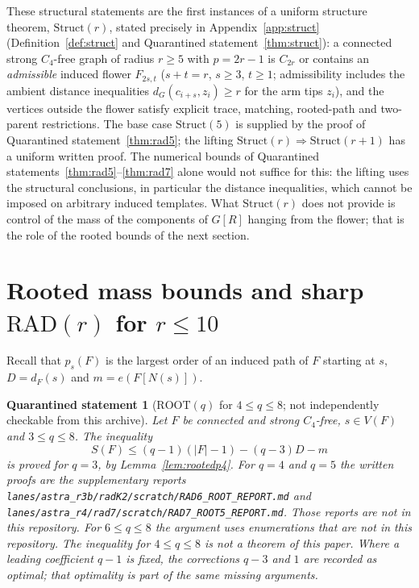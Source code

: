 \documentclass[11pt]{amsart}
\newtheorem{qrecord}[theorem]{Quarantined statement}
\theoremstyle{definition}
\theoremstyle{remark}
\newcommand{\pp}{p}
\newcommand{\RAD}{\mathrm{RAD}}
\newcommand{\ROOT}{\mathrm{ROOT}}
\begin{document}
These structural statements are the first instances of a uniform structure theorem, $\mathrm{Struct}(r)$, stated precisely in Appendix~\ref{app:struct} (Definition~\ref{def:struct} and Quarantined statement~\ref{thm:struct}): a connected strong $C_4$-free graph of radius $r\ge5$ with $\pp=2r-1$ is $C_{2r}$ or contains an \emph{admissible} induced flower $F_{2s,t}$ ($s+t=r$, $s\ge3$, $t\ge1$; admissibility includes the ambient distance inequalities $d_G(c_{i+s},z_i)\ge r$ for the arm tips $z_i$), and the vertices outside the flower satisfy explicit trace, matching, rooted-path and two-parent restrictions. The base case $\mathrm{Struct}(5)$ is supplied by the proof of Quarantined statement~\ref{thm:rad5}; the lifting $\mathrm{Struct}(r)\Rightarrow\mathrm{Struct}(r+1)$ has a uniform written proof. The numerical bounds of Quarantined statements~\ref{thm:rad5}--\ref{thm:rad7} alone would not suffice for this: the lifting uses the structural conclusions, in particular the distance inequalities, which cannot be imposed on arbitrary induced templates. What $\mathrm{Struct}(r)$ does not provide is control of the mass of the components of $G[R]$ hanging from the flower; that is the role of the rooted bounds of the next section.

\section{Rooted mass bounds and sharp \texorpdfstring{$\RAD(r)$}{RAD(r)} for \texorpdfstring{$r\le10$}{r<=10}}\label{sec:root}

Recall that $\pp_s(F)$ is the largest order of an induced path of $F$ starting at $s$, $D=d_F(s)$ and $m=e(F[N(s)])$.

\begin{qrecord}[$\ROOT(q)$ for $4\le q\le8$; not independently checkable from this archive]\label{thm:root}
Let $F$ be connected and strong $C_4$-free, $s\in V(F)$ and $3\le q\le8$. The inequality
\[
S(F)\le(q-1)(|F|-1)-(q-3)D-m
\]
is proved for $q=3$, by Lemma~\ref{lem:rootedp4}. For $q=4$ and $q=5$ the written proofs are the supplementary reports \nolinkurl{lanes/astra_r3b/radK2/scratch/RAD6_ROOT_REPORT.md} and \nolinkurl{lanes/astra_r4/rad7/scratch/RAD7_ROOT5_REPORT.md}. Those reports are not in this repository. For $6\le q\le8$ the argument uses enumerations that are not in this repository. The inequality for $4\le q\le8$ is not a theorem of this paper. Where a leading coefficient $q-1$ is fixed, the corrections $q-3$ and $1$ are recorded as optimal; that optimality is part of the same missing arguments.
\end{qrecord}
\end{document}
